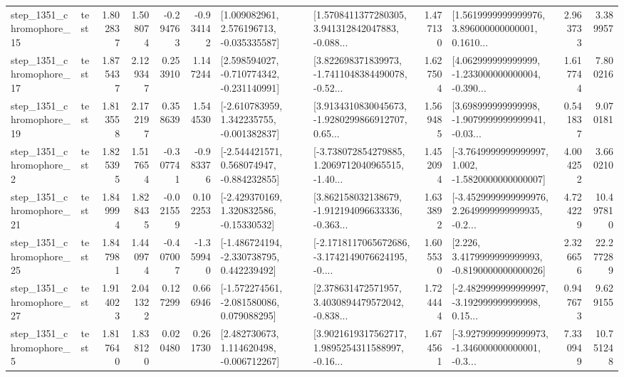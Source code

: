 \begin{tabular}{llrrrrllrlrr}
 step\_1351\_chromophore\_15 &      test &      1.802837 &    1.508074 &     -0.294763 & -0.934142 &    [1.009082961, 2.576196713, -0.035335587] &  [1.5708411377280305, 3.941312842047883, -0.088... &       1.477130 &  [1.5619999999999976, 3.896000000000001, 0.1610... &            2.963733 &          3.389957 \\
 step\_1351\_chromophore\_17 &      test &      1.875437 &    2.129347 &      0.253910 &  1.147244 &   [2.598594027, -0.710774342, -0.231140991] &  [3.822698371839973, -1.7411048384490078, -0.52... &       1.627504 &  [4.062999999999999, -1.233000000000004, -0.390... &            1.617744 &          7.800216 \\
 step\_1351\_chromophore\_19 &      test &      1.813558 &    2.172197 &      0.358639 &  1.544530 &   [-2.610783959, 1.342235755, -0.001382837] &  [3.9134310830045673, -1.9280299866912707, 0.65... &       1.569485 &  [3.698999999999998, -1.9079999999999941, -0.03... &            0.541837 &          9.070181 \\
  step\_1351\_chromophore\_2 &      test &      1.825395 &    1.517654 &     -0.307741 & -0.983376 &   [-2.544421571, 0.568074947, -0.884232855] &  [-3.738072854279885, 1.2069712040965515, -1.40... &       1.452094 &  [-3.7649999999999997, 1.002, -1.5820000000000007] &            4.004252 &          3.660210 \\
 step\_1351\_chromophore\_21 &      test &      1.849994 &    1.828435 &     -0.021559 &  0.102253 &    [-2.429370169, 1.320832586, -0.15330532] &  [3.862158032138679, -1.912194096633336, -0.363... &       1.633892 &  [-3.4529999999999976, 2.2649999999999935, -0.2... &            4.724229 &         10.497810 \\
 step\_1351\_chromophore\_25 &      test &      1.847981 &    1.440974 &     -0.407007 & -1.359940 &   [-1.486724194, -2.330738795, 0.442239492] &  [-2.1718117065672686, -3.1742149076624195, -0.... &       1.605530 &   [2.226, 3.4179999999999993, -0.8190000000000026] &            2.326656 &         22.277289 \\
 step\_1351\_chromophore\_27 &      test &      1.914023 &    2.041322 &      0.127299 &  0.666946 &   [-1.572274561, -2.081580086, 0.079088295] &  [2.378631472571957, 3.4030894479572042, -0.838... &       1.724444 &  [-2.4829999999999997, -3.192999999999998, 0.15... &            0.947673 &          9.629155 \\
  step\_1351\_chromophore\_5 &      test &      1.817640 &    1.838120 &      0.020480 &  0.261730 &    [2.482730673, 1.114620498, -0.006712267] &  [3.9021619317562717, 1.9895254311588997, -0.16... &       1.674561 &  [-3.9279999999999973, -1.346000000000001, -0.3... &            7.330949 &         10.751248 \\

\end{tabular}

